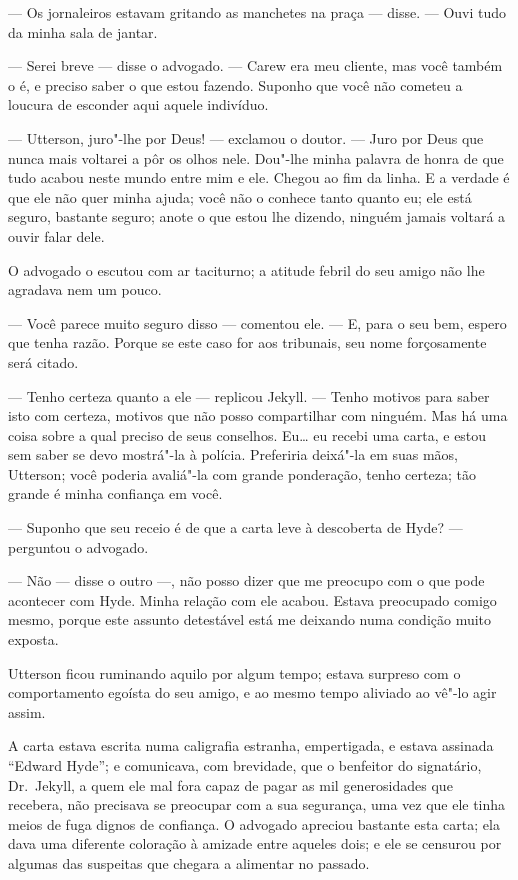 --- Os jornaleiros estavam gritando as manchetes na praça --- disse. ---
Ouvi tudo da minha sala de jantar.

--- Serei breve --- disse o advogado. --- Carew era meu cliente, mas você
também o é, e preciso saber o que estou fazendo. Suponho que você não
cometeu a loucura de esconder aqui aquele indivíduo.

--- Utterson, juro"-lhe por Deus! --- exclamou o doutor. --- Juro por Deus
que nunca mais voltarei a pôr os olhos nele.  Dou"-lhe minha palavra de
honra de que tudo acabou neste mundo entre mim e ele.  Chegou ao fim da
linha.  E a verdade é que ele não quer minha ajuda; você não o conhece
tanto quanto eu; ele está seguro, bastante seguro; anote o que estou
lhe dizendo, ninguém jamais voltará a ouvir falar dele. 

O advogado o escutou com ar taciturno; a atitude febril do seu amigo não
lhe agradava nem um pouco.

--- Você parece muito seguro disso --- comentou ele. --- E, para o seu bem,
espero que tenha razão.  Porque se este caso for aos tribunais, seu
nome forçosamente será citado.

--- Tenho certeza quanto a ele --- replicou Jekyll. --- Tenho motivos para
saber isto com certeza, motivos que não posso compartilhar com ninguém.
 Mas há uma coisa sobre a qual preciso de seus conselhos. Eu\ldots{} eu
recebi uma carta, e estou sem saber se devo mostrá"-la à polícia. 
Preferiria deixá"-la em suas mãos, Utterson; você poderia avaliá"-la com
grande ponderação, tenho certeza; tão grande é minha confiança em você.

--- Suponho que seu receio é de que a carta leve à descoberta de Hyde? ---
perguntou o advogado.

--- Não --- disse o outro ---, não posso dizer que me preocupo com o que
pode acontecer com Hyde.  Minha relação com ele acabou.  Estava
preocupado comigo mesmo, porque este assunto detestável está me
deixando numa condição muito exposta.

Utterson ficou ruminando aquilo por algum tempo; estava surpreso com o
comportamento egoísta do seu amigo, e ao mesmo tempo aliviado ao vê"-lo
agir assim.

A carta estava escrita numa caligrafia estranha, empertigada, e estava
assinada “Edward Hyde”; e comunicava, com brevidade, que o benfeitor do
signatário, Dr.~Jekyll, a quem ele mal fora capaz de pagar as mil
generosidades que recebera, não precisava se preocupar com a sua
segurança, uma vez que ele tinha meios de fuga dignos de confiança.  O
advogado apreciou bastante esta carta; ela dava uma diferente coloração
à amizade entre aqueles dois; e ele se censurou por algumas das
suspeitas que chegara a alimentar no passado.

